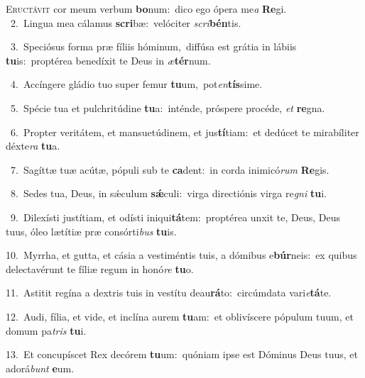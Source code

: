 \lettrine{\initial\textcolor{\initialcolor}{E}}{ructávit} cor meum verbum \textbf{bo}\-num:~\star dico ego ópera me\textit{a} \textbf{Re}\-gi.\\
{\numbfont\textcolor{\numbcolor}{~2.}}~Lingua mea cálamus \textbf{scri}\-bæ:~\star velóciter \textit{scri}\-\textbf{bén}tis.\par
{\numbfont\textcolor{\numbcolor}{~3.}}~Speciósus forma præ fíliis hóminum,~\dagger diffúsa est grátia in lábiis \textbf{tu}\-is:~\star proptérea benedíxit te Deus in \textit{æ}\-\textbf{tér}num.\par
{\numbfont\textcolor{\numbcolor}{~4.}}~Accíngere gládio tuo super femur \textbf{tu}\-um,~\star pot\-\textit{en}\-\textbf{tís}sime.\par
{\numbfont\textcolor{\numbcolor}{~5.}}~Spécie tua et pulchritúdine \textbf{tu}\-a:~\star inténde, próspere procéde, \textit{et} \textbf{re}\-gna.\par
{\numbfont\textcolor{\numbcolor}{~6.}}~Propter veritátem, et mansuetúdinem, et jus\-\textbf{tí}\-tiam:~\star et dedúcet te mirabíliter déxte\textit{ra} \textbf{tu}\-a.\par
{\numbfont\textcolor{\numbcolor}{~7.}}~Sagíttæ tuæ acútæ, pópuli sub te \textbf{ca}\-dent:~\star in corda inimicó\textit{rum} \textbf{Re}\-gis.\par
{\numbfont\textcolor{\numbcolor}{~8.}}~Sedes tua, Deus, in sǽculum \textbf{sǽ}\-culi:~\star virga directiónis virga re\textit{gni} \textbf{tu}\-i.\par
{\numbfont\textcolor{\numbcolor}{~9.}}~Dilexísti justítiam, et odísti iniqui\-\textbf{tá}\-tem:~\star proptérea unxit te, Deus, Deus tuus, óleo lætítiæ præ consórti\textit{bus} \textbf{tu}\-is.\par
{\numbfont\textcolor{\numbcolor}{10.}}~Myrrha, et gutta, et cásia a vestiméntis tuis, a dómibus e\-\textbf{búr}\-neis:~\star ex quibus delectavérunt te fíliæ regum in honó\textit{re} \textbf{tu}\-o.\par
{\numbfont\textcolor{\numbcolor}{11.}}~Astitit regína a dextris tuis in vestítu deau\-\textbf{rá}\-to:~\star circúmdata vari\-\textit{e}\-\textbf{tá}te.\par
{\numbfont\textcolor{\numbcolor}{12.}}~Audi, fília, et vide, et inclína aurem \textbf{tu}\-am:~\star et oblivíscere pópulum tuum, et domum pa\textit{tris} \textbf{tu}\-i.\par
{\numbfont\textcolor{\numbcolor}{13.}}~Et concupíscet Rex decórem \textbf{tu}\-um:~\star quóniam ipse est Dóminus Deus tuus, et adorá\textit{bunt} \textbf{e}\-um.\par
